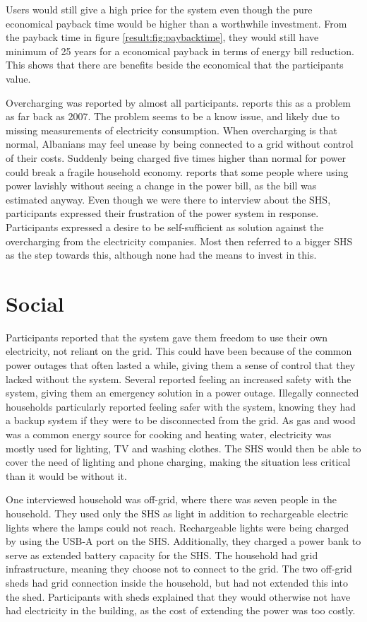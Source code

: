 Users would still give a high price for the system even though the pure economical payback time would be higher than a worthwhile investment. From the payback time in figure \ref{result:fig:paybacktime}, they would still have minimum of 25 years for a economical payback in terms of energy bill reduction. This shows that there are benefits beside the economical that the participants value. 

Overcharging was reported by almost all participants. \citep{likmeta2007} reports this as a problem as far back as 2007. The problem seems to be a know issue, and likely due to missing measurements of electricity consumption. When overcharging is that normal, Albanians may feel unease by being connected to a grid without control of their costs. Suddenly being charged five times higher than normal for power could break a fragile household economy. \citep{Hejsek2011} reports that some people where using power lavishly without seeing a change in the power bill, as the bill was estimated anyway. Even though we were there to interview about the SHS, participants expressed their frustration of the power system in response. Participants expressed a desire to be self-sufficient as solution against the overcharging from the electricity companies. Most then referred to a bigger SHS as the step towards this, although none had the means to invest in this.

\section{Social}
Participants reported that the system gave them freedom to use their own electricity, not reliant on the grid. This could have been because of the common power outages that often lasted a while, giving them a sense of control that they lacked without the system. Several reported feeling an increased safety with the system, giving them an emergency solution in a power outage. Illegally connected households particularly reported feeling safer with the system, knowing they had a backup system if they were to be disconnected from the grid. As gas and wood was a common energy source for cooking and heating water, electricity was mostly used for lighting, TV and washing clothes. The SHS would then be able to cover the need of lighting and phone charging, making the situation less critical than it would be without it.

One interviewed household was off-grid, where there was seven people in the household. They used only the SHS as light in addition to rechargeable electric lights where the lamps could not reach. Rechargeable lights were being charged by using the USB-A port on the SHS. Additionally, they charged a power bank to serve as extended battery capacity for the SHS. The household had grid infrastructure, meaning they choose not to connect to the grid. The two off-grid sheds had grid connection inside the household, but had not extended this into the shed. Participants with sheds explained that they would otherwise not have had electricity in the building, as the cost of extending the power was too costly. 

